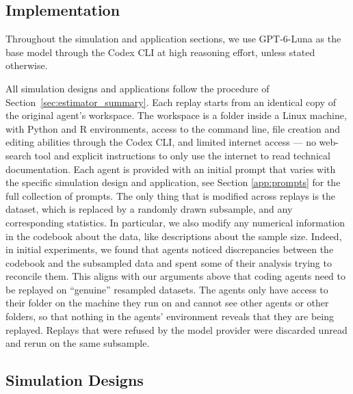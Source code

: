 \documentclass[10pt]{article}
\begin{document}
\subsection{Implementation} \label{sec:implementation}

Throughout the simulation and application sections, we use GPT-6-Luna as the base model through the Codex CLI at high reasoning effort, unless stated otherwise.

All simulation designs and applications follow the procedure of Section~\ref{sec:estimator_summary}.  Each replay starts from an identical copy of the original agent's workspace. The workspace is a folder inside a Linux machine, with Python and R environments, access to the command line, file creation and editing abilities through the Codex CLI, and limited internet access --- no web-search tool and explicit instructions to only use the internet to read technical documentation. Each agent is provided with an initial prompt that varies with the specific simulation design and application, see Section \ref{app:prompts} for the full collection of prompts. The only thing that is modified across replays is the dataset, which is replaced by a randomly drawn subsample, and any corresponding statistics. In particular, we also modify any numerical information in the codebook about the data, like descriptions about the sample size. Indeed, in initial experiments, we found that agents noticed discrepancies between the codebook and the subsampled data and spent some of their analysis trying to reconcile them. This aligns with our arguments above that coding agents need to be replayed on ``genuine'' resampled datasets.
The agents only have access to their folder on the machine they run on and cannot see other agents or other folders, so that nothing in the agents' environment reveals that they are being replayed. Replays that were refused by the model provider were discarded unread and rerun on the same subsample.

\subsection{Simulation Designs} \label{sec:simulation_designs}
\end{document}
